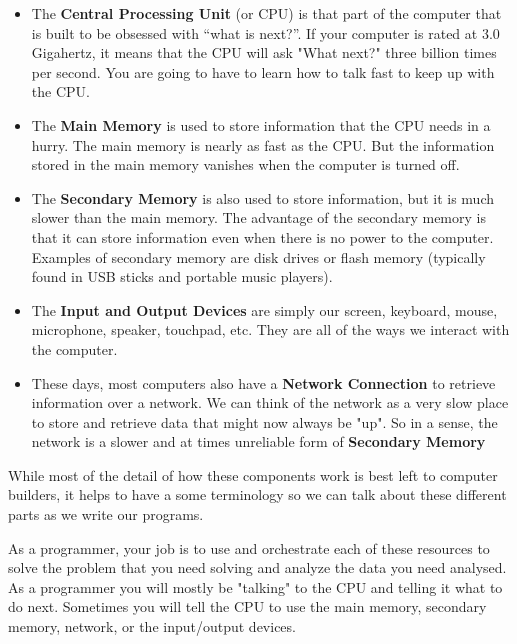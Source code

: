 \documentclass[10pt]{book}
\begin{document}
\begin{itemize}

\item The {\bf Central Processing Unit} (or CPU) is 
that part of the computer that is built to be obsessed 
with ``what is next?''.  If your computer is rated
at 3.0 Gigahertz, it means that the CPU will ask "What next?"
three billion times per second.  You are going to have to 
learn how to talk fast to keep up with the CPU.

\item The {\bf Main Memory} is used to store information
that the CPU needs in a hurry.  The main memory is nearly as 
fast as the CPU.  But the information stored in the main
memory vanishes when the computer is turned off.

\item The {\bf Secondary Memory} is also used to store
information, but it is much slower than the main memory.
The advantage of the secondary memory is that it can
store information even when there is no power to the
computer.  Examples of secondary memory are disk drives
or flash memory (typically found in USB sticks and portable
music players).

\item The {\bf Input and Output Devices} are simply our
screen, keyboard, mouse, microphone, speaker, touchpad, etc.  
They are all of the ways we interact with the computer.

\item These days, most computers also have a
{\bf Network Connection} to retrieve information over a network.
We can think of the network as a very slow place to store and
retrieve data that might now always be "up".  So in a sense,
the network is a slower and at times unreliable form of
{\bf Secondary Memory}

\end{itemize}

While most of the detail of how these components work is best left 
to computer builders, it helps to have a some terminology
so we can talk about these different parts as we write our programs.

As a programmer, your job is to use and orchestrate 
each of these resources to solve the problem that you need solving
and analyze the data you need analysed.  As a programmer you will 
mostly be "talking" to the CPU and telling it what to 
do next.  Sometimes you will tell the CPU to use the main memory,
secondary memory, network, or the input/output devices.
\end{document}
